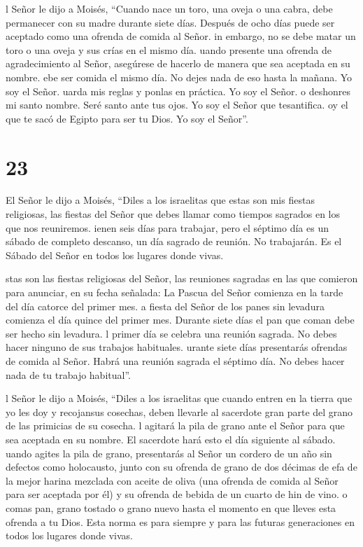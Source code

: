  l Señor le dijo a Moisés,  ``Cuando nace un
toro, una oveja o una cabra, debe permanecer con su madre durante siete
días. Después de ocho días puede ser aceptado como una ofrenda de comida
al Señor.  in embargo, no se debe matar un toro o una oveja
y sus crías en el mismo día.  uando presente una ofrenda de
agradecimiento al Señor, asegúrese de hacerlo de manera que sea aceptada
en su nombre.  ebe ser comida el mismo día. No dejes nada
de eso hasta la mañana. Yo soy el Señor.  uarda mis reglas
y ponlas en práctica. Yo soy el Señor.  o deshonres mi
santo nombre. Seré santo ante tus ojos. Yo soy el Señor que tesantifica.
 oy el que te sacó de Egipto para ser tu Dios. Yo soy el
Señor''.

\hypertarget{section-22}{%
\section{23}\label{section-22}}

 El Señor le dijo a Moisés,  ``Diles a los
israelitas que estas son mis fiestas religiosas, las fiestas del Señor
que debes llamar como tiempos sagrados en los que nos reuniremos.
 ienen seis días para trabajar, pero el séptimo día es un
sábado de completo descanso, un día sagrado de reunión. No trabajarán.
Es el Sábado del Señor en todos los lugares donde vivas.

 stas son las fiestas religiosas del Señor, las reuniones
sagradas en las que comieron para anunciar, en su fecha señalada:
 La Pascua del Señor comienza en la tarde del día catorce
del primer mes.  a fiesta del Señor de los panes sin
levadura comienza el día quince del primer mes. Durante siete días el
pan que coman debe ser hecho sin levadura.  l primer día se
celebra una reunión sagrada. No debes hacer ninguno de sus trabajos
habituales.  urante siete días presentarás ofrendas de
comida al Señor. Habrá una reunión sagrada el séptimo día. No debes
hacer nada de tu trabajo habitual''.

 l Señor le dijo a Moisés,  ``Diles a los
israelitas que cuando entren en la tierra que yo les doy y recojansus
cosechas, deben llevarle al sacerdote gran parte del grano de las
primicias de su cosecha.  l agitará la pila de grano ante
el Señor para que sea aceptada en su nombre. El sacerdote hará esto el
día siguiente al sábado.  uando agites la pila de grano,
presentarás al Señor un cordero de un año sin defectos como holocausto,
 junto con su ofrenda de grano de dos décimas de efa de la
mejor harina mezclada con aceite de oliva (una ofrenda de comida al
Señor para ser aceptada por él) y su ofrenda de bebida de un cuarto de
hin de vino.  o comas pan, grano tostado o grano nuevo
hasta el momento en que lleves esta ofrenda a tu Dios. Esta norma es
para siempre y para las futuras generaciones en todos los lugares donde
vivas.

